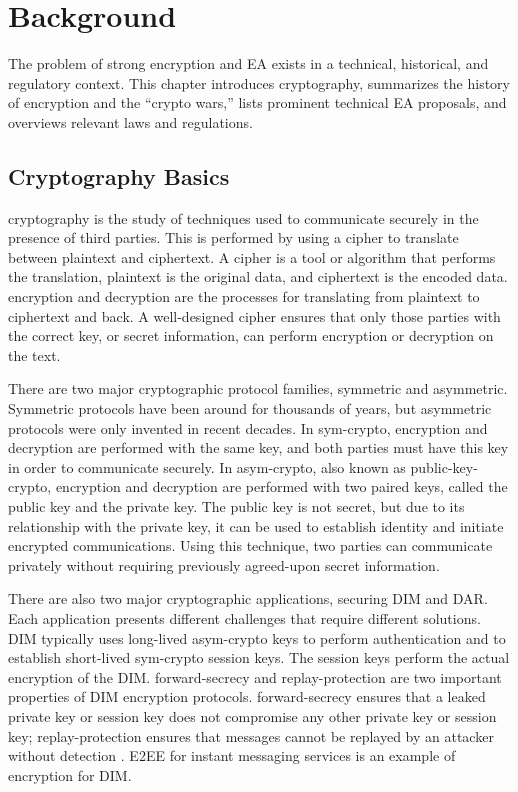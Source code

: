 \chapter{Background}
\label{chap-background}

The problem of strong encryption and \acl{EA} exists in a technical, historical, and regulatory context. This chapter
introduces cryptography, summarizes the history of encryption and the ``crypto wars,'' lists prominent technical \ac{EA}
proposals, and overviews relevant laws and regulations.



\section{Cryptography Basics}
\label{sec-crypto-basics}

\Ac{cryptography} is the study of techniques used to communicate securely in the presence of third parties. This is
performed by using a \ac{cipher} to translate between \ac{plaintext} and \ac{ciphertext}. A cipher is a tool or
algorithm that performs the translation, plaintext is the original data, and ciphertext is the encoded data.
\Ac{encryption} and \ac{decryption} are the processes for translating from plaintext to ciphertext and back. A
well-designed cipher ensures that only those parties with the correct \ac{key}, or secret information, can perform
encryption or decryption on the text.


There are two major cryptographic protocol families, symmetric and asymmetric. Symmetric protocols have been around for
thousands of years, but asymmetric protocols were only invented in recent decades. In \ac{sym-crypto}, encryption and
decryption are performed with the same key, and both parties must have this key in order to communicate securely. In
\ac{asym-crypto}, also known as \ac{public-key-crypto}, encryption and decryption are performed with two paired keys,
called the public key and the private key. The public key is not secret, but due to its relationship with the private
key, it can be used to establish identity and initiate encrypted communications. Using this technique, two parties can
communicate privately without requiring previously agreed-upon secret information.

There are also two major cryptographic applications, securing \ac{DIM} and \ac{DAR}. Each application presents different
challenges that require different solutions. \Ac{DIM} typically uses long-lived \ac{asym-crypto} keys to perform
authentication and to establish short-lived \ac{sym-crypto} session keys. The session keys perform the actual encryption
of the \acl{DIM}. \Ac{forward-secrecy} and \ac{replay-protection} are two important properties of \ac{DIM} encryption
protocols. \Ac{forward-secrecy} ensures that a leaked private key or session key does not compromise any other private
key or session key; \ac{replay-protection} ensures that messages cannot be replayed by an attacker without detection
\cite{bellovin_thinking_2016}. \Ac{E2EE} for instant messaging services is an example of encryption for \ac{DIM}.

